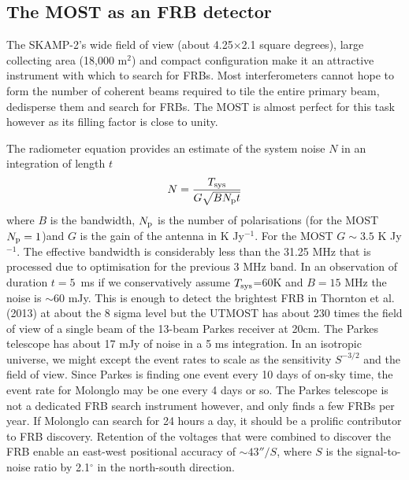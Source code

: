 \subsection{The MOST as an FRB detector}
The SKAMP-2's wide field of view (about 4.25$\times$2.1 square degrees), large collecting area (18,000 m$^2$) and compact configuration make it an attractive instrument with which to search for FRBs. Most interferometers cannot hope to form the number of coherent beams required to tile the entire primary beam, dedisperse them and search for FRBs. The MOST is almost perfect for this task however as its filling factor is close to unity. 

The radiometer equation provides an estimate of the system noise $N$ in an integration of length $t$ 
\begin{equation}
N={{T_{\rm sys}}\over{G\sqrt{BN_{\rm p}t}}}
\end{equation}
\noindent where $B$ is the bandwidth, $N_{\rm p}$ is the number of polarisations (for the MOST $N_{\rm p}=1$)and $G$ is the gain of the antenna in K Jy$^{-1}$. For the MOST $G\sim 3.5$ K Jy$^{-1}$. The effective bandwidth is considerably less than the 31.25 MHz that is processed due to optimisation for the previous 3 MHz band. In an observation of duration $t=5$\, ms if we conservatively assume $T_{\rm sys}$=60K and $B=15 $ MHz the noise is $\sim$60 mJy. This is enough to detect the brightest FRB in Thornton et al. (2013) at about the 8 sigma level but the UTMOST has about 230 times the field of view of a single beam of the 13-beam Parkes receiver at 20cm. The Parkes telescope has about 17 mJy of noise in a 5 ms integration. In an isotropic universe, we might except the event rates to scale as the sensitivity $S^{-3/2}$ and the field of view. Since Parkes is finding one event every 10 days of on-sky time, the event rate for Molonglo may be one every 4 days or so. The Parkes telescope is not a dedicated FRB search instrument however, and only finds a few FRBs per year. If Molonglo can search for 24 hours a day, it should be a prolific contributor to FRB discovery. Retention of the voltages that were combined to discover the FRB enable an east-west positional accuracy of $\sim 43''/S$, where $S$ is the signal-to-noise ratio by 2.1$^{\circ}$ in the north-south direction.
